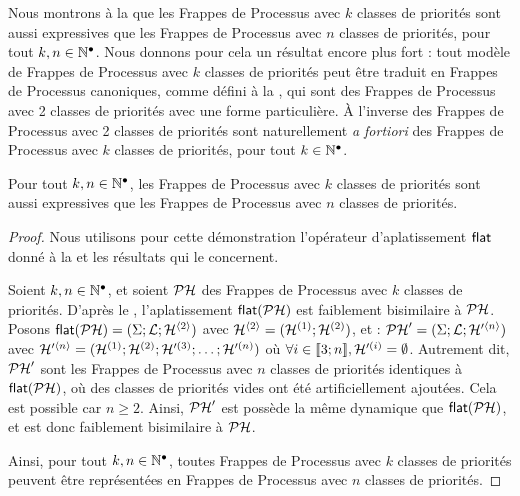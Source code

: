 
Nous montrons à la  que les Frappes de Processus avec $k$ classes
de priorités sont aussi expressives que les Frappes de Processus avec $n$ classes de
priorités, pour tout $k, n \in \mathbb{N}^\bullet$.
Nous donnons pour cela un résultat encore plus fort : tout modèle de Frappes de Processus avec $k$
classes de priorités peut être traduit en Frappes de Processus canoniques,
comme défini à la ,
qui sont des Frappes de Processus avec 2 classes de priorités
avec une forme particulière.
À l'inverse des Frappes de Processus avec 2 classes de priorités sont
naturellement \textit{a fortiori}
des Frappes de Processus avec $k$ classes de priorités, pour tout $k \in \mathbb{N}^\bullet$.

\begin{theorem}
  Pour tout $k, n \in \mathbb{N}^\bullet$, les Frappes de Processus avec $k$ classes de priorités
  sont aussi expressives que les Frappes de Processus avec $n$ classes de priorités.
\end{theorem}

\begin{proof}
  Nous utilisons pour cette démonstration
  l'opérateur d'aplatissement $\mathsf{flat}$ donné à la 
  et les résultats qui le concernent.
  
  Soient $k, n \in \mathbb{N}^\bullet$,
  et soient $\mathcal{PH}$ des Frappes de Processus avec $k$ classes de priorités.
  D'après le ,
  l'aplatissement $\mathsf{flat}(\mathcal{PH})$ est faiblement bisimilaire à $\mathcal{PH}$.
  Posons $\mathsf{flat}(\mathcal{PH}) = (\Sigma; \mathcal{L}; \mathcal{H}^{{\langle 2 \rangle}})$
  avec $\mathcal{H}^{{\langle 2 \rangle}} = (\mathcal{H}^{(1)}; \mathcal{H}^{(2)})$,
  et : $\mathcal{PH}' = (\Sigma; \mathcal{L}; \mathcal{H}'^{{\langle n \rangle}})$
  avec $\mathcal{H}'^{{\langle n \rangle}} = (\mathcal{H}^{(1)}; \mathcal{H}^{(2)}; \mathcal{H}'^{(3)}; \ldots; \mathcal{H}'^{(n)})$
  où $\forall i \in \llbracket 3; n \rrbracket, \mathcal{H}'^{(i)} = \emptyset$.
  Autrement dit, $\mathcal{PH}'$ sont les Frappes de Processus avec $n$ classes de priorités
  identiques à $\mathsf{flat}(\mathcal{PH})$, où des classes de priorités vides ont été
  artificiellement ajoutées.
  Cela est possible car $n \geq 2$.
  Ainsi, $\mathcal{PH}'$ est possède la même dynamique que $\mathsf{flat}(\mathcal{PH})$,
  et est donc faiblement bisimilaire à $\mathcal{PH}$.
  
  Ainsi, pour tout $k, n \in \mathbb{N}^\bullet$,
  toutes Frappes de Processus avec $k$ classes de priorités peuvent être représentées
  en Frappes de Processus avec $n$ classes de priorités.
\end{proof}



